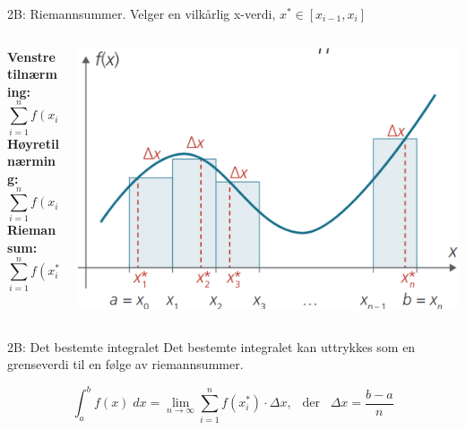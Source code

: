 \blueheader
\begin{frame}{2B: Riemannsummer. Velger en vilkårlig x-verdi, $x^*\in[x_{i-1},x_i]$}
    \begin{columns} 
        \begin{column}{0.35\textwidth}
    \textbf{Venstretilnærming:}
        \begin{equation*}
            \sum_{i=1}^n f(x_{i-1})\cdot \Delta x
        \end{equation*}
      \textbf{Høyretilnærming:}
        \begin{equation*}
            \sum_{i=1}^n f(x_{i})\cdot \Delta x
        \end{equation*}
    \textbf{Riemansum:}
       \begin{equation*}
            \sum_{i=1}^n f(x^*_{i})\cdot \Delta x
        \end{equation*}
        \end{column}
        \begin{column}{0.65\textwidth}
            \centering
            \includegraphics[width=1\linewidth]{R2-K2B-1.png}
        \end{column}
    \end{columns}
\end{frame}

\redheader
\begin{frame}{2B: Det bestemte integralet}
    Det bestemte integralet kan uttrykkes som en grenseverdi til en følge av riemannsummer.

    \begin{equation*}
        \int_a^b f(x)\;dx=\lim_{n\rightarrow\infty}\sum_{i=1}^nf(x_i^*)\cdot \Delta x, \:\;\; \text{der} \;\;\; \Delta x = \frac{b-a}{n}
    \end{equation*}
\end{frame}

